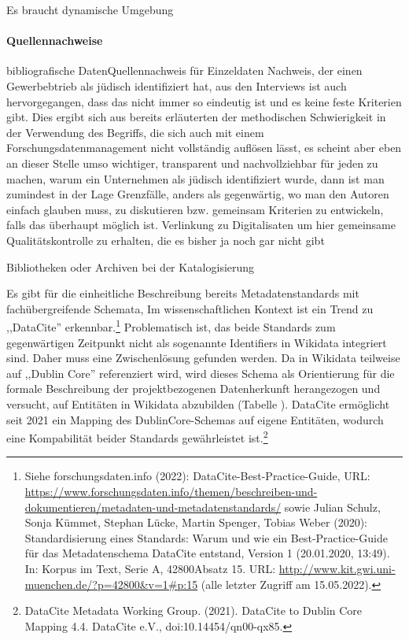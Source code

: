Es braucht dynamische Umgebung
\paragraph{Quellennachweise}
bibliografische DatenQuellennachweis für Einzeldaten
Nachweis, der einen Gewerbebtrieb als jüdisch identifiziert hat, aus den Interviews ist auch hervorgegangen, dass das nicht immer so eindeutig ist und es keine feste Kriterien gibt. Dies ergibt sich aus bereits erläuterten der methodischen Schwierigkeit in der Verwendung des Begriffs, die sich auch mit einem Forschungsdatenmanagement nicht vollständig auflösen lässt, es scheint aber eben an dieser Stelle umso wichtiger, transparent und nachvollziehbar für jeden zu machen, warum ein Unternehmen als jüdisch identifiziert wurde, dann ist man zumindest in der Lage Grenzfälle, anders als gegenwärtig, wo man den Autoren einfach glauben muss, zu diskutieren bzw. gemeinsam Kriterien zu entwickeln, falls das überhaupt möglich ist.
Verlinkung zu Digitalisaten um hier gemeinsame Qualitätskontrolle zu erhalten, die es bisher ja noch gar nicht gibt

Bibliotheken oder Archiven bei der Katalogisierung 



Es gibt für die einheitliche Beschreibung bereits Metadatenstandards mit fachübergreifende Schemata,  Im wissenschaftlichen Kontext ist ein Trend zu ,,DataCite'' erkennbar.\footnote{Siehe forschungsdaten.info (2022): DataCite-Best-Practice-Guide, URL: \url{https://www.forschungsdaten.info/themen/beschreiben-und-dokumentieren/metadaten-und-metadatenstandards/} sowie Julian Schulz, Sonja Kümmet, Stephan Lücke, Martin Spenger, Tobias Weber (2020): Standardisierung eines Standards: Warum und wie ein Best-Practice-Guide für das Metadatenschema DataCite entstand, Version 1 (20.01.2020, 13:49). In: Korpus im Text, Serie A, 42800Absatz 15. URL: \url{http://www.kit.gwi.uni-muenchen.de/?p=42800&v=1\#p:15} (alle letzter Zugriff am 15.05.2022).} Problematisch ist, das beide Standards zum gegenwärtigen Zeitpunkt nicht als sogenannte Identifiers in Wikidata integriert sind. Daher muss eine Zwischenlösung gefunden werden. Da in Wikidata teilweise auf ,,Dublin Core'' referenziert wird, wird dieses Schema als Orientierung für die formale Beschreibung der projektbezogenen Datenherkunft herangezogen und versucht, auf Entitäten in Wikidata abzubilden (Tabelle ). DataCite ermöglicht seit 2021 ein Mapping des DublinCore-Schemas auf eigene Entitäten, wodurch eine Kompabilität beider Standards gewährleistet ist.\footnote{DataCite Metadata Working Group. (2021). DataCite to Dublin Core Mapping 4.4. DataCite e.V., doi:10.14454/qn00-qx85.}


